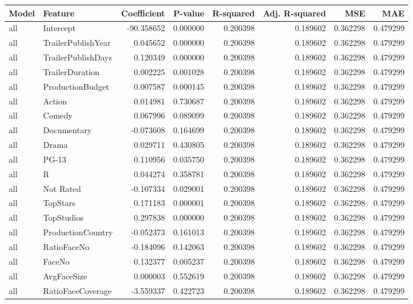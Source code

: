 \begin{tabular}{llrrrrrr}
\toprule
Model & Feature & Coefficient & P-value & R-squared & Adj. R-squared & MSE & MAE \\
\midrule
all & Intercept & -90.358652 & 0.000000 & 0.200398 & 0.189602 & 0.362298 & 0.479299 \\
all & TrailerPublishYear & 0.045652 & 0.000000 & 0.200398 & 0.189602 & 0.362298 & 0.479299 \\
all & TrailerPublishDays & 0.120349 & 0.000000 & 0.200398 & 0.189602 & 0.362298 & 0.479299 \\
all & TrailerDuration & 0.002225 & 0.001028 & 0.200398 & 0.189602 & 0.362298 & 0.479299 \\
all & ProductionBudget & 0.007587 & 0.000145 & 0.200398 & 0.189602 & 0.362298 & 0.479299 \\
all & Action & 0.014981 & 0.730687 & 0.200398 & 0.189602 & 0.362298 & 0.479299 \\
all & Comedy & 0.067996 & 0.089099 & 0.200398 & 0.189602 & 0.362298 & 0.479299 \\
all & Documentary & -0.073608 & 0.164699 & 0.200398 & 0.189602 & 0.362298 & 0.479299 \\
all & Drama & 0.029711 & 0.430805 & 0.200398 & 0.189602 & 0.362298 & 0.479299 \\
all & PG-13 & 0.110956 & 0.035750 & 0.200398 & 0.189602 & 0.362298 & 0.479299 \\
all & R & 0.044274 & 0.358781 & 0.200398 & 0.189602 & 0.362298 & 0.479299 \\
all & Not Rated & -0.107334 & 0.029001 & 0.200398 & 0.189602 & 0.362298 & 0.479299 \\
all & TopStars & 0.171183 & 0.000001 & 0.200398 & 0.189602 & 0.362298 & 0.479299 \\
all & TopStudios & 0.297838 & 0.000000 & 0.200398 & 0.189602 & 0.362298 & 0.479299 \\
all & ProductionCountry & -0.052373 & 0.161013 & 0.200398 & 0.189602 & 0.362298 & 0.479299 \\
all & RatioFaceNo & -0.184096 & 0.142063 & 0.200398 & 0.189602 & 0.362298 & 0.479299 \\
all & FaceNo & 0.132377 & 0.005237 & 0.200398 & 0.189602 & 0.362298 & 0.479299 \\
all & AvgFaceSize & 0.000003 & 0.552619 & 0.200398 & 0.189602 & 0.362298 & 0.479299 \\
all & RatioFaceCoverage & -3.559337 & 0.422723 & 0.200398 & 0.189602 & 0.362298 & 0.479299 \\

\end{tabular}

